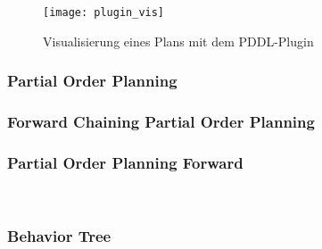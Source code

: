 \begin{figure}[ht!]
    \centering
    \texttt{[image: plugin\_vis]}
    \caption{Visualisierung eines Plans mit dem PDDL-Plugin}
    \label{fig:pluginvis}
\end{figure}
\subsubsection{Partial Order Planning}
\subsubsection{Forward Chaining Partial Order Planning}
\subsubsection{Partial Order Planning Forward}
~\citep{popf}
\subsubsection{Behavior Tree}